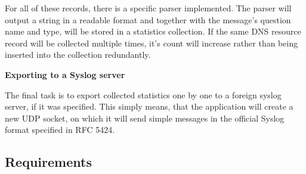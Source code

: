 \vspace{0.5cm}

For all of these records, there is a specific parser implemented. 
The parser will output a string in a readable format and together 
with the message's question name and type, will be stored in a statistics collection.
If the same DNS resource record will be collected multiple times, 
it's count will increase rather than being inserted into the collection redundantly.

\pagebreak

\textbf{Exporting to a Syslog server}

The final task is to export collected statistics one by one to a foreign syslog server, if it was specified.
This simply means, that the application will create a new UDP socket, on which it will send simple messages 
in the official Syslog format specified in RFC 5424.

\subsection{Requirements}

